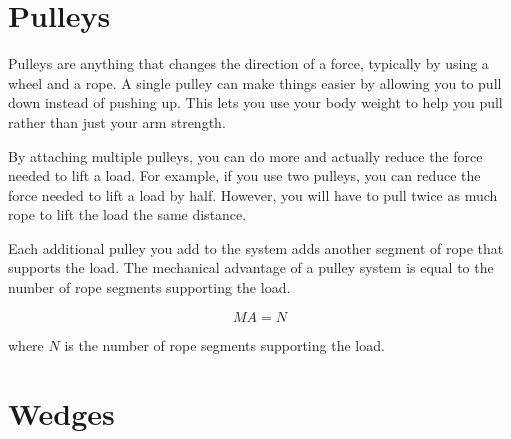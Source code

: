 \section{Pulleys}

Pulleys are anything that changes the direction of a force, typically by
using a wheel and a rope. A single pulley can make things easier by allowing you
to pull down instead of pushing up. This lets you use your body weight to help
you pull rather than just your arm strength. 

By attaching multiple pulleys, you can do more and actually reduce the force needed
to lift a load. For example, if you use two pulleys, you can reduce the force
needed to lift a load by half. However, you will have to pull twice as much rope
to lift the load the same distance.

Each additional pulley you add to the system adds another segment of rope that
supports the load. The mechanical advantage of a pulley system is equal to the
number of rope segments supporting the load.

\[
MA = N
\]

where \( N \) is the number of rope segments supporting the load.


\section{Wedges}
